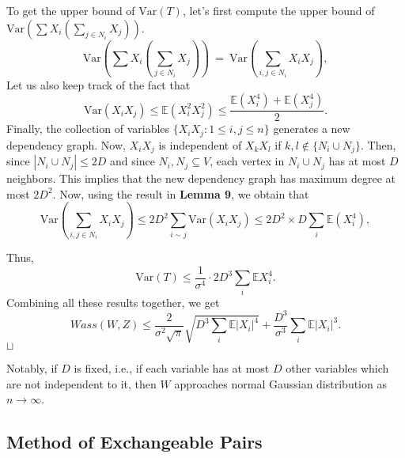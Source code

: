\documentclass[12pt]{article}
\newcommand\qed{\hfill\hbox{\rlap{$\sqcap$}$\sqcup$}}
\newcommand{\eq }{\: = \:}
\theoremstyle{nonumberplain}
\begin{document}
\noindent
To get the upper bound of $\mathrm{Var}(T)$, let's first compute the upper bound of $\mathrm{Var}(\sum X_{i}(\sum_{j\in N_{i}}X_{j}))$.
$$
\mathrm{Var}(\sum X_{i}(\sum_{j\in N_{i}}X_{j}))\eq \mathrm{Var}(\sum_{i,j\in N_{i}}X_{i}X_{j}),
$$
Let us also keep track of the fact that 
$$
\mathrm{Var}(X_{i}X_{j})\leq \mathbb{E}(X_{i}^{2}X_{j}^{2})\leq \frac{\mathbb{E}(X_{i}^{4})+\mathbb{E}(X_{j}^{4})}{2}.
$$
Finally, the collection of variables $\{ X_iX_j: 1 \le i, j \le n \} $ generates a new dependency graph. Now, $X_{i}X_{j}$ is independent of $X_{k}X_{l}$ if $k,l\notin \{N_{i}\cup N_{j} \}$. Then, since $|N_{i}\cup N_{j}|\leq 2D$ and since $N_{i}, N_{j}\subseteq V$, each vertex in $N_{i}\cup N_{j}$ has at most $D$ neighbors. This implies that the new dependency graph has maximum degree at most $2D^{2}$. Now, using the result in \textbf{Lemma 9}, we obtain that
$$
\mathrm{Var}(\sum_{i,j\in N_{i}}X_{i}X_{j})\leq 2D^{2}\sum_{i\sim j} \mathrm{Var}(X_{i}X_{j})\leq 2D^{2}\times D\sum_{i} \mathbb{E}(X_{i}^4),
$$

\noindent
Thus, 
$$
\mathrm{Var}(T)\leq \frac{1}{\sigma^{4}}\cdot 2D^{3}\sum_{i}\mathbb{E}X_{i}^{4}.
$$
Combining all these results together, we get
$$
Wass(W,Z)\leq \frac{2}{\sigma ^{2} \sqrt{\pi}} \sqrt{D^{3}\sum_{i} \mathbb{E}|X_{i}|^{4}} + \frac{D^{3}}{\sigma^{3}} \sum_{i} \mathbb{E}|X_{i}|^{3}.
$$
\qed

Notably, if $D$ is fixed, i.e., if each variable has at most $D$ other variables which are not independent to it, then $W$ approaches normal Gaussian distribution as $n \to \infty$.

\medskip
\noindent

\subsection{Method of Exchangeable Pairs}
\end{document}
